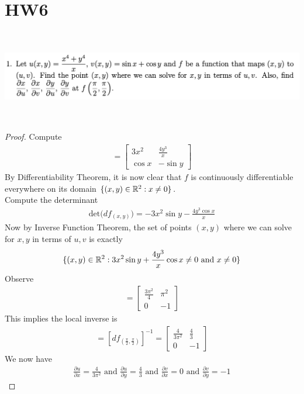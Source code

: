 \documentclass{report}
\begin{document}
\section{HW6}
\begin{question}{}{}
\includegraphics[height=4cm,width=18cm]{hw6a1}
\end{question}
\begin{proof}
Compute
\begin{align*}
[df_{(x,y)}]=\begin{bmatrix}
  3x^2 & \frac{4y^3}{x}\\
  \cos x & - \sin y
\end{bmatrix}
\end{align*}
By Differentiability Theorem, it is now clear that $f$ is continuously differentiable everywhere on its domain $\{ (x,y)\in\mathbb{R}^2 :x\neq 0 \}$.\\

Compute the determinant 
\begin{align*}
\text{det}\Big(df_{(x,y)} \Big)= -3x^2 \sin y - \frac{4y^3 \cos x}{x}
\end{align*}
Now by Inverse Function Theorem, the set of points $(x,y)$ where we can solve for $x,y$ in terms of $u,v$ is exactly
\begin{align*}
\{ (x,y)\in\mathbb{R}^2: 3x^2 \sin y + \frac{4y^3}{x}\cos x\neq 0 \text{ and }x\neq 0 \}
\end{align*}
Observe 
\begin{align*}
[df_{(\frac{\pi}{2}, \frac{\pi}{2})}]= \begin{bmatrix}
  \frac{3\pi^2}{4} & \pi^2 \\
  0 & -1
\end{bmatrix}
\end{align*}
This implies the local inverse is 
\begin{align*}
  [d(f^{-1})_{f(\frac{\pi}{2},\frac{\pi}{2})}]=[df_{(\frac{\pi}{2},\frac{\pi}{2})}]^{-1}= \begin{bmatrix}
    \frac{4}{3\pi^2} & \frac{4}{3}\\
    0 & -1
  \end{bmatrix}
\end{align*}
We now have 
\begin{align*}
\frac{\partial  u}{\partial x}= \frac{4}{3\pi^2}\text{ and }\frac{\partial u}{\partial y}= \frac{4}{3}\text{ and } \frac{\partial v}{\partial x}=0 \text{ and } \frac{\partial v}{\partial y}=-1
\end{align*}
\end{proof}
\end{document}
